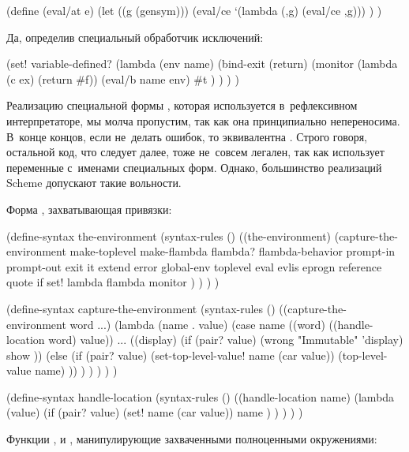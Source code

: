 \begin{code:lisp}
(define (eval/at e)
  (let ((g (gensym)))
    (eval/ce `(lambda (,g) (eval/ce ,g))) ) )
\end{code:lisp}



Да, определив специальный обработчик исключений:

\begin{code:lisp}
(set! variable-defined?
      (lambda (env name)
        (bind-exit (return)
          (monitor (lambda (c ex) (return #f))
            (eval/b name env)
            #t ) ) ) )
\end{code:lisp}



Реализацию специальной формы , которая используется в~рефлексивном
интерпретаторе, мы молча пропустим, так как она принципиально непереносима.
В~конце концов, если не~делать ошибок, то  эквивалентна .
Строго говоря, остальной код, что следует далее, тоже не~совсем легален, так
как использует переменные с~именами специальных форм. Однако, большинство
реализаций Scheme допускают такие вольности.

Форма , захватывающая привязки:

\begin{code:lisp}
(define-syntax the-environment
  (syntax-rules ()
    ((the-environment)
     (capture-the-environment make-toplevel make-flambda flambda?
      flambda-behavior prompt-in prompt-out exit it extend error
      global-env toplevel eval evlis eprogn reference quote if set!
      lambda flambda monitor ) ) ) )

(define-syntax capture-the-environment
  (syntax-rules ()
    ((capture-the-environment word ...)
     (lambda (name . value)
       (case name
         ((word) ((handle-location word) value)) ...
         ((display) (if (pair? value)
                        (wrong "Immutable" 'display)
                        show ))
         (else (if (pair? value)
                   (set-top-level-value! name (car value))
                   (top-level-value name) )) ) ) ) ) )

(define-syntax handle-location
  (syntax-rules ()
    ((handle-location name)
     (lambda (value)
       (if (pair? value) (set! name (car value))
           name ) ) ) ) )
\end{code:lisp}

Функции ,  и ,
манипулирующие захваченными полноценными окружениями:

